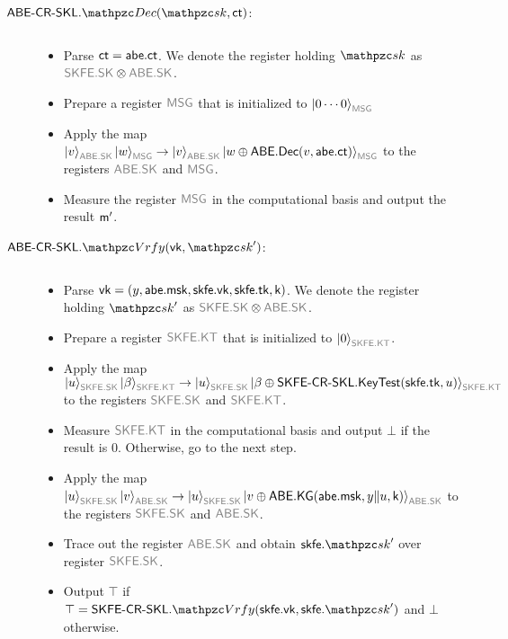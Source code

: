 \begin{description}
\item[$\ABESKL.\qDec(\qsk,\ct)$:] $ $
\begin{itemize}
   \item Parse $\mathsf{ct}=\mathsf{abe}.\mathsf{ct}$. We denote the register holding $\qsk$ as $\qreg{SKFE.SK}\tensor\qreg{ABE.SK}$.
   \item Prepare a register $\qreg{MSG}$ that is initialized to $\ket{0\cdots0}_{\qreg{MSG}}$
   \item Apply the map $\ket{v}_{\qreg{ABE.SK}}\ket{w}_{\qreg{MSG}}\ra\ket{v}_{\qreg{ABE.SK}}\ket{w\oplus\ABE.\Dec(v,\abe.\ct)}_{\qreg{MSG}}$ to the registers $\qreg{ABE.SK}$ and $\qreg{MSG}$.
   \item Measure the register $\qreg{MSG}$ in the computational basis and output the result $\mathsf{m}^\prime$.
\end{itemize}


\item[$\ABESKL.\qVrfy(\vk,\qsk^\prime)$:] $ $
\begin{itemize}
    \item Parse $\mathsf{vk}=(y,\mathsf{abe}.\mathsf{msk},\mathsf{skfe}.\mathsf{vk},\mathsf{skfe}.\mathsf{tk}, \mathsf{k})$. We denote the register holding $\qsk^\prime$ as $\qreg{SKFE.SK}\tensor\qreg{ABE.SK}$.
    \item Prepare a register $\qreg{SKFE.KT}$ that is initialized to $\ket{0}_{\qreg{SKFE.KT}}$.
    \item Apply the map $\ket{u}_{\qreg{SKFE.SK}}\ket{\beta}_{\qreg{SKFE.KT}}\ra\ket{u}_{\qreg{SKFE.SK}}\ket{\beta\oplus\SKFESKL.\KeyTest(\skfe.\tk,u)}_{\qreg{SKFE.KT}}$ to the registers $\qreg{SKFE.SK}$ and $\qreg{SKFE.KT}$.
    \item Measure $\qreg{SKFE.KT}$ in the computational basis and
        output $\bot$ if the result is $0$. Otherwise, go to the next step.
    \item Apply the map
        $\ket{u}_{\qreg{SKFE.SK}}\ket{v}_{\qreg{ABE.SK}}\ra\ket{u}_{\qreg{SKFE.SK}}\ket{v\oplus\ABE.\KG(\abe.\msk,y\|u,\key)}_{\qreg{ABE.SK}}$ to the registers $\qreg{SKFE.SK}$ and $\qreg{ABE.SK}$.
    \item Trace out the register $\qreg{ABE.SK}$ and obtain
        $\skfe.\qsk^\prime$ over register $\qreg{SKFE.SK}$.
    \item Output $\top$ if $\top=\SKFESKL.\qVrfy(\skfe.\vk,\skfe.\qsk^\prime)$ and $\bot$ otherwise.

\end{itemize}
\end{description}

